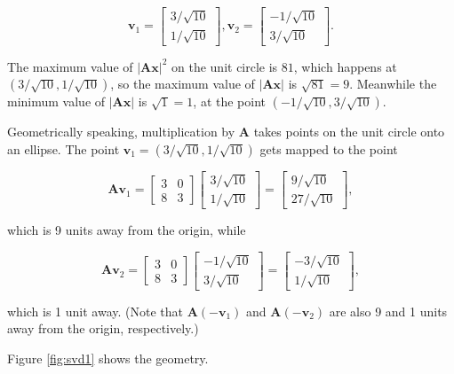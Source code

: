 \documentclass[
]{book}
\theoremstyle{definition}
\theoremstyle{definition}
\theoremstyle{definition}
\theoremstyle{definition}
\theoremstyle{remark}
\begin{document}
\[\mathbf{v}_1=\begin{bmatrix}3/\sqrt{10}\\1/\sqrt{10}\end{bmatrix},\mathbf{v}_2=\begin{bmatrix}-1/\sqrt{10}\\ 3/\sqrt{10}\end{bmatrix}.\]

The maximum value of \(|\mathbf{A}\mathbf{x}|^2\) on the unit circle is \(81\), which happens at \((3/\sqrt{10},1/\sqrt{10})\), so the maximum value of \(|\mathbf{A}\mathbf{x}|\) is \(\sqrt{81}=9\). Meanwhile the minimum value of \(|\mathbf{A}\mathbf{x}|\) is \(\sqrt{1}=1\), at the point \((-1/\sqrt{10},3/\sqrt{10})\).

Geometrically speaking, multiplication by \(\mathbf{A}\) takes points on the unit circle onto an ellipse. The point \(\mathbf{v}_1=(3/\sqrt{10},1/\sqrt{10})\) gets mapped to the point

\[\mathbf{A}\mathbf{v}_1=\begin{bmatrix}3 & 0\\8 & 3\end{bmatrix}\begin{bmatrix}3/\sqrt{10}\\1/\sqrt{10}\end{bmatrix}=\begin{bmatrix}9/\sqrt{10}\\27/\sqrt{10}\end{bmatrix},\]

which is 9 units away from the origin, while

\[\mathbf{A}\mathbf{v}_2=\begin{bmatrix}3 & 0\\8 & 3\end{bmatrix}\begin{bmatrix}-1/\sqrt{10}\\3/\sqrt{10}\end{bmatrix}=\begin{bmatrix}-3/\sqrt{10}\\1/\sqrt{10}\end{bmatrix},\]

which is 1 unit away. (Note that \(\mathbf{A}(-\mathbf{v}_1)\) and \(\mathbf{A}(-\mathbf{v}_2)\) are also 9 and 1 units away from the origin, respectively.)

Figure \ref{fig:svd1} shows the geometry.
\end{document}
